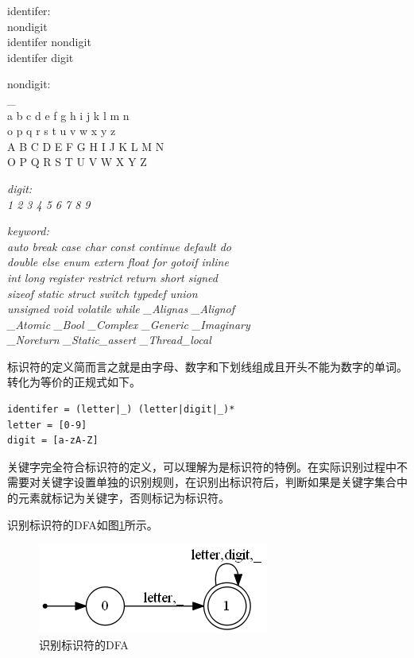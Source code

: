 \documentclass[UTF8, twoside, titlepage]{ctexart}
\newenvironment{lex}
{
	\linespread{1.2}
	\leftskip=2.5cm
	\rightskip=2.5cm
	\itshape
	\setlength{\parindent}{-1cm}
}
{\par}
\begin{document}
\begin{lex}
identifer:\\
	nondigit\\
    identifer nondigit\\
    identifer digit
    
nondigit: \\
{
	\normalfont
	\ttfamily
	\_\\
	a b c d e f g h i j k l m n\\
	o p q r s t u v w x y z\\
	A B C D E F G H I J K L M N\\
	O P Q R S T U V W X Y Z	
}

\itshape
digit: \\
{
	\normalfont
	 1 2 3 4 5 6 7 8 9
}

\itshape
keyword: \\
{
	\normalfont
	\ttfamily
	auto break case char const continue default do\\
    double else enum extern float for gotoif inline\\
    int long register restrict return short signed\\
    sizeof static struct switch typedef union\\
    unsigned void volatile while \_Alignas \_Alignof\\
    \_Atomic \_Bool \_Complex \_Generic \_Imaginary\\
    \_Noreturn \_Static\_assert \_Thread\_local
}
\end{lex}

标识符的定义简而言之就是由字母、数字和下划线组成且开头不能为数字的单词。转化为等价的正规式如下。

\begin{lstlisting}
identifer = (letter|_) (letter|digit|_)*
letter = [0-9]
digit = [a-zA-Z]
\end{lstlisting}

关键字完全符合标识符的定义，可以理解为是标识符的特例。在实际识别过程中不需要对关键字设置单独的识别规则，在识别出标识符后，判断如果是关键字集合中的元素就标记为关键字，否则标记为标识符。

识别标识符的DFA如图\ref{fig:identifier}所示。

\begin{figure}[htbp]
	\centering
	\includegraphics[scale=0.54]{images/identifier.png}
	\caption{识别标识符的DFA}
	\label{fig:identifier}
\end{figure}
\end{document}
